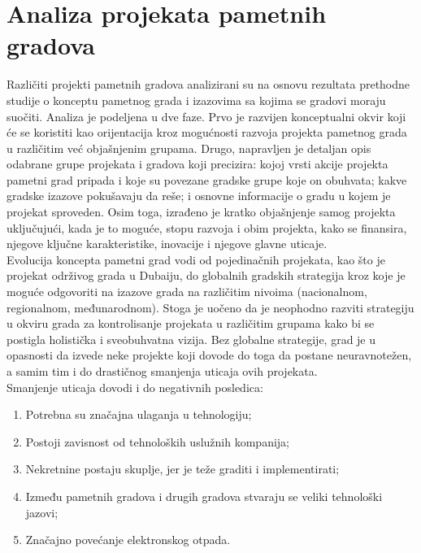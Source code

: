 \documentclass[a4paper,12pt]{article}
\begin{document}
{\section{Analiza projekata pametnih gradova}
\label{slike_i_tabele}

Različiti projekti pametnih gradova analizirani su na osnovu rezultata prethodne studije o konceptu pametnog grada i izazovima sa kojima se gradovi moraju suočiti. Analiza je podeljena u dve faze. Prvo je razvijen konceptualni okvir koji će se koristiti kao orijentacija kroz mogućnosti razvoja projekta pametnog grada u različitim već objašnjenim grupama. Drugo, napravljen je detaljan opis odabrane grupe projekata i gradova koji precizira: kojoj vrsti akcije projekta pametni grad pripada i koje su povezane gradske grupe koje on obuhvata; kakve gradske izazove pokušavaju da reše; i osnovne informacije o gradu u kojem je projekat sproveden. Osim toga, izrađeno je kratko objašnjenje samog projekta uključujući, kada je to moguće, stopu razvoja i obim projekta, kako se finansira, njegove ključne karakteristike, inovacije i njegove glavne uticaje. \\

Evolucija koncepta pametni grad vodi od pojedinačnih projekata, kao što je projekat održivog grada u Dubaiju, do globalnih gradskih strategija kroz koje je moguće odgovoriti na izazove grada na različitim nivoima (nacionalnom, regionalnom, međunarodnom). Stoga je uočeno da je neophodno razviti strategiju u okviru grada za kontrolisanje projekata u različitim grupama kako bi se postigla holistička i sveobuhvatna vizija.  Bez globalne strategije, grad je u opasnosti da izvede neke projekte koji dovode do toga da postane neuravnotežen, a samim tim i do drastičnog smanjenja uticaja ovih projekata. \\
Smanjenje uticaja dovodi i do negativnih posledica: 
\begin {enumerate}
\item Potrebna su značajna ulaganja u tehnologiju;
\item Postoji zavisnost od tehnoloških uslužnih kompanija;
\item Nekretnine postaju skuplje, jer je teže graditi i implementirati;
\item Između pametnih gradova i drugih gradova stvaraju se veliki tehnološki jazovi;
\item Značajno povećanje elektronskog otpada.
\end {enumerate}

}
\end{document}
